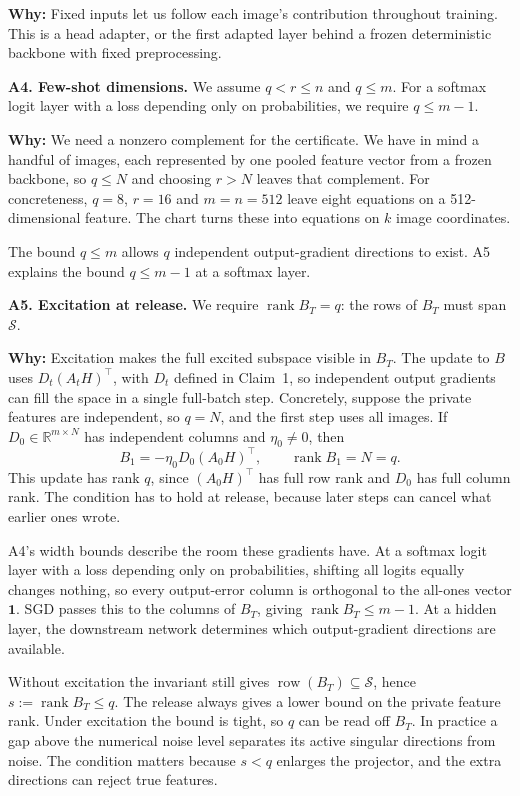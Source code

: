 \documentclass[11pt,a4paper]{article}
\newcommand{\rank}{\operatorname{rank}}
\newcommand{\row}{\operatorname{row}}
\newcommand{\Sdata}{\mathcal S}
\begin{document}
\textbf{Why:} Fixed inputs let us follow each image's contribution throughout
training. This is a head adapter, or the first adapted layer behind a frozen
deterministic backbone with fixed preprocessing.

\textbf{A4. Few-shot dimensions.} We assume \(q<r\le n\) and \(q\le m\).
For a softmax logit layer with a loss depending only on probabilities,
we require \(q\le m-1\).

\textbf{Why:} We need a nonzero complement for the certificate. We have in mind
a handful of images, each represented by one pooled feature vector from a frozen
backbone, so \(q\le N\) and choosing \(r>N\) leaves that complement.
For concreteness, \(q=8\), \(r=16\) and \(m=n=512\) leave eight equations on a
512-dimensional feature. The chart turns these into equations on \(k\) image
coordinates.

The bound \(q\le m\) allows \(q\) independent output-gradient directions to
exist. A5 explains the bound \(q\le m-1\) at a softmax layer.

\textbf{A5. Excitation at release.} We require \(\rank B_T=q\):
the rows of \(B_T\) must span \(\Sdata\).

\textbf{Why:} Excitation makes the full excited subspace visible in \(B_T\).
The update to \(B\) uses \(D_t(A_tH)^\top\), with \(D_t\) defined in Claim~1,
so independent output gradients can fill the space in a single full-batch step.
Concretely, suppose
the private features are independent, so \(q=N\), and the first step uses all
images. If \(D_0\in\mathbb R^{m\times N}\) has independent columns and
\(\eta_0\ne0\), then
\[
B_1=-\eta_0D_0(A_0H)^\top,\qquad \rank B_1=N=q.
\]
This update has rank \(q\), since \((A_0H)^\top\) has full row rank and \(D_0\)
has full column rank. The condition has to hold at release, because later
steps can cancel what earlier ones wrote.

A4's width bounds describe the room these gradients have. At a softmax logit
layer with a loss depending only on probabilities, shifting all logits equally
changes nothing, so every output-error column is orthogonal to the all-ones
vector \(\mathbf1\). SGD passes this to the columns of \(B_T\), giving
\(\rank B_T\le m-1\). At a hidden layer, the downstream network determines
which output-gradient directions are available.

Without excitation the invariant still gives \(\row(B_T)\subseteq\Sdata\),
hence \(s:=\rank B_T\le q\). The release always gives a lower bound on the private
feature rank. Under excitation the bound is tight, so \(q\) can be read off
\(B_T\). In practice a gap above the numerical noise level separates its active
singular directions from noise. The condition matters because \(s<q\) enlarges
the projector, and the extra directions can reject true features.
\end{document}
